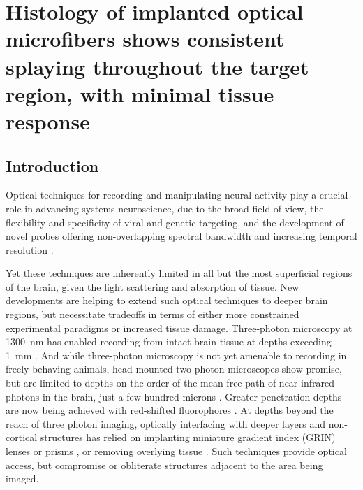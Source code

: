 \chapter{Histology of implanted optical microfibers shows consistent splaying throughout the target
region, with minimal tissue response}
\label{chapter:histology}
\thispagestyle{myheadings}

\graphicspath{{3_Histology/Figures/}}

\section{Introduction}

Optical techniques for recording and manipulating neural activity play a 
crucial role in advancing systems neuroscience, due to the broad field of 
view, the flexibility and specificity of viral and genetic targeting, and 
the development of novel probes offering non-overlapping spectral 
bandwidth and increasing temporal resolution 
\cite{Emiliani:2015jl,Gong:2015is}.

Yet these techniques are inherently limited in all but the most 
superficial regions of the brain, given the light scattering and 
absorption of tissue. New developments are helping to extend such optical 
techniques to deeper brain regions, but necessitate tradeoffs in terms of 
either more constrained experimental paradigms or increased tissue damage. 
Three-photon microscopy at 1300~nm has enabled recording from intact brain tissue at 
depths exceeding 1~mm \cite{Horton:2013gxa,Wang:2017jp}. And while 
three-photon microscopy is not yet amenable to recording in freely 
behaving animals, head-mounted two-photon microscopes show promise, but 
are limited to depths on the order of the mean free path of near infrared 
photons in the brain, just a few hundred microns \cite{Zong:2017eg}. 
Greater penetration depths are now being achieved with red-shifted 
fluorophores \cite{Dana:2016hx}. At depths beyond the reach of three 
photon imaging, optically interfacing with deeper layers 
and non-cortical structures has relied on implanting miniature gradient 
index (GRIN) lenses or prisms 
\cite{Jung:2004kv,Barretto:2009hk,Andermann:2013kc,Cui:2013dq}, or removing 
overlying tissue \cite{Dombeck:2010jr}. Such techniques provide 
optical access, but compromise or obliterate structures adjacent to the 
area being imaged.

